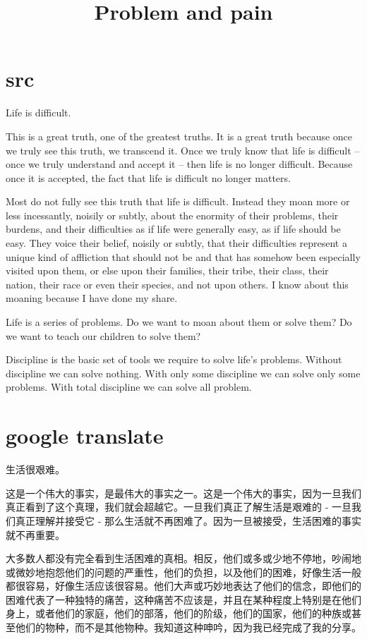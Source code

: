 \documentclass[UTF8]{article}
\title{Problem and pain}
\begin{document}
\maketitle

\section{src}
Life is difficult.

This is a great truth, one of the greatest truths. It is a great truth because once we truly see this truth, we transcend it. Once we truly know that life is difficult -- once we truly understand and accept it -- then life is no longer difficult. Because once it is accepted, the fact that life is difficult no longer matters.

Most do not fully see this truth that life is difficult. Instead they moan more or less incessantly, noisily or subtly, about the enormity of their problems, their burdens, and their difficulties as if life were generally easy, as if life should be easy. They voice their belief, noisily or subtly, that their difficulties represent a unique kind of affliction that should not be and that has somehow been especially visited upon them, or else upon their families, their tribe, their class, their nation, their race or even their species, and not upon others. I know about this moaning because I have done my share.

Life is a series of problems. Do we want to moan about them or solve them? Do we want to teach our children to solve them?

Discipline is the basic set of tools we require to solve life's problems. Without discipline we can solve nothing. With only some discipline we can solve only some problems. With total discipline we can solve all problem.
\section{google translate}
生活很艰难。

这是一个伟大的事实，是最伟大的事实之一。这是一个伟大的事实，因为一旦我们真正看到了这个真理，我们就会超越它。一旦我们真正了解生活是艰难的 - 一旦我们真正理解并接受它 - 那么生活就不再困难了。因为一旦被接受，生活困难的事实就不再重要。

大多数人都没有完全看到生活困难的真相。相反，他们或多或少地不停地，吵闹地或微妙地抱怨他们的问题的严重性，他们的负担，以及他们的困难，好像生活一般都很容易，好像生活应该很容易。他们大声或巧妙地表达了他们的信念，即他们的困难代表了一种独特的痛苦，这种痛苦不应该是，并且在某种程度上特别是在他们身上，或者他们的家庭，他们的部落，他们的阶级，他们的国家，他们的种族或甚至他们的物种，而不是其他物种。我知道这种呻吟，因为我已经完成了我的分享。
\end{document}
